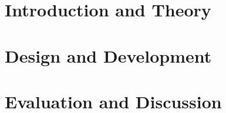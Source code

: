 \documentclass[11pt,a4paper,bibtotoc,idxtotoc,headsepline,footsepline,footexclude,BCOR12mm,DIV13]{scrbook}
\begin{document}
	\frontmatter
	
	
	
%	
%	
	
	\let\cleardoublepage\clearpage
%	
	\clearemptydoublepage
	
	
	
	\let\cleardoublepage\clearpage
	
	\let\cleardoublepage\clearpage
	
	\let\cleardoublepage\clearpage
	
\let\cleardoublepage\clearpage
	\tableofcontents
  
	  

 
	\mainmatter
	
	
		\part[Introduction and Theory]{Introduction and Theory}
		\label{part:introAndBackgroundTheory}
		\let\cleardoublepage\clearpage
		
		\let\cleardoublepage\clearpage
		
		\part[Design and Development]{Design and Development}
		\label{part:designAndDev}
		\let\cleardoublepage\clearpage
		
		\let\cleardoublepage\clearpage
		
		\part[Evaluation and Discussion]{Evaluation and Discussion}
		\label{part:evalAnddis}
		\let\cleardoublepage\clearpage
		
		\let\cleardoublepage\clearpage
		
\end{document}
